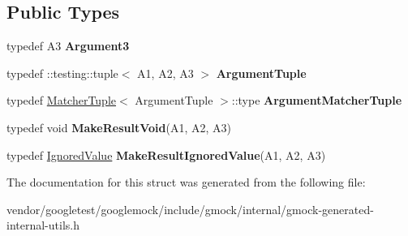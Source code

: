\subsection*{Public Types}
\begin{DoxyCompactItemize}
\item 
\mbox{\label{structtesting_1_1internal_1_1_function_3_01_r_07_a1_00_01_a2_00_01_a3_08_4_a2ac6eefb33feafe85c1c6742bdab509f}} 
typedef A3 {\bfseries Argument3}
\item 
\mbox{\label{structtesting_1_1internal_1_1_function_3_01_r_07_a1_00_01_a2_00_01_a3_08_4_a6f1e1097947a9e13a4e29099a61de804}} 
typedef \+::testing\+::tuple$<$ A1, A2, A3 $>$ {\bfseries Argument\+Tuple}
\item 
\mbox{\label{structtesting_1_1internal_1_1_function_3_01_r_07_a1_00_01_a2_00_01_a3_08_4_acb08fa0fffe1213ce88f53343bb3b564}} 
typedef \hyperlink{structtesting_1_1internal_1_1_matcher_tuple}{Matcher\+Tuple}$<$ Argument\+Tuple $>$\+::type {\bfseries Argument\+Matcher\+Tuple}
\item 
\mbox{\label{structtesting_1_1internal_1_1_function_3_01_r_07_a1_00_01_a2_00_01_a3_08_4_a6b9f583a9ef6755cc92ce2b7fa255b84}} 
typedef void {\bfseries Make\+Result\+Void}(A1, A2, A3)
\item 
\mbox{\label{structtesting_1_1internal_1_1_function_3_01_r_07_a1_00_01_a2_00_01_a3_08_4_abff7468ae8231766e7b396c8a407cb5a}} 
typedef \hyperlink{classtesting_1_1internal_1_1_ignored_value}{Ignored\+Value} {\bfseries Make\+Result\+Ignored\+Value}(A1, A2, A3)
\end{DoxyCompactItemize}


The documentation for this struct was generated from the following file\+:\begin{DoxyCompactItemize}
\item 
vendor/googletest/googlemock/include/gmock/internal/gmock-\/generated-\/internal-\/utils.\+h\end{DoxyCompactItemize}
